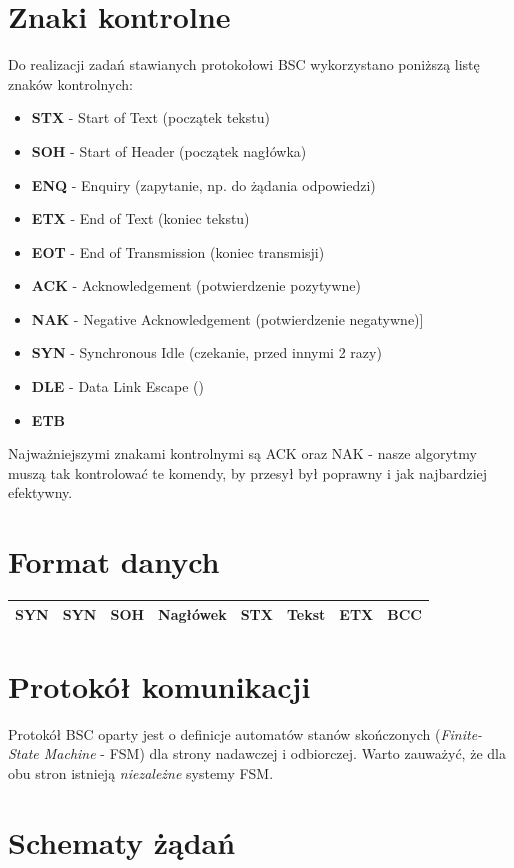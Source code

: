 	\section{Znaki kontrolne}
		Do realizacji zadań stawianych protokołowi BSC wykorzystano poniższą listę znaków kontrolnych:
		\begin{itemize}
			\item \textbf{STX} - Start of Text (początek tekstu)
			\item \textbf{SOH} - Start of Header (początek nagłówka)
			\item \textbf{ENQ} - Enquiry (zapytanie, np. do żądania odpowiedzi)
			\item \textbf{ETX} - End of Text (koniec tekstu)
			\item \textbf{EOT} - End of Transmission (koniec transmisji)
			\item \textbf{ACK} - Acknowledgement (potwierdzenie pozytywne)
			\item \textbf{NAK} - Negative Acknowledgement (potwierdzenie negatywne)]
			\item \textbf{SYN} - Synchronous Idle (czekanie, przed innymi 2 razy)
			\item \textbf{DLE} - Data Link Escape ()
			\item \textbf{ETB}
		\end{itemize}
		Najważniejszymi znakami kontrolnymi są ACK oraz NAK - nasze algorytmy muszą tak kontrolować te komendy, by przesył był poprawny i jak najbardziej efektywny.
	\section{Format danych}
		\begin{table}[h]
			\begin{tabular}{|c|c|c|c|c|c|c|c|}
				\hline
				SYN	&	SYN	&	SOH	&	Nagłówek	&	STX	& Tekst	&	ETX	&	BCC\\ \hline
			\end{tabular}
		\end{table}
	\section{Protokół komunikacji}
		Protokół BSC oparty jest o definicje automatów stanów skończonych (\emph{Finite-State Machine} - FSM) dla strony nadawczej i odbiorczej. Warto zauważyć, że dla obu stron istnieją \textit{niezależne} systemy FSM.
	\section{Schematy żądań}
